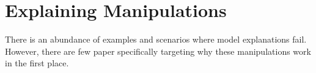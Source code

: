 \section{Explaining Manipulations}
\label{sec:explaining_manipulations}


There is an abundance of examples and scenarios where model explanations fail. However, there are few paper specifically targeting why these manipulations work in the first place. 

